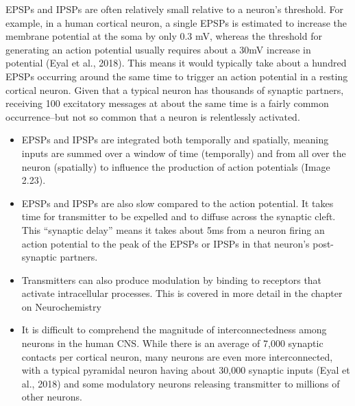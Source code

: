 \documentclass[
]{book}
\providecommand{\tightlist}{%
  \setlength{\itemsep}{0pt}\setlength{\parskip}{0pt}}
\begin{document}
EPSPs and IPSPs are often relatively small relative to a neuron's threshold. For example, in a human cortical neuron, a single EPSPs is estimated to increase the membrane potential at the soma by only 0.3 mV, whereas the threshold for generating an action potential usually requires about a 30mV increase in potential (Eyal et al., 2018). This means it would typically take about a hundred EPSPs occurring around the same time to trigger an action potential in a resting cortical neuron. Given that a typical neuron has thousands of synaptic partners, receiving 100 excitatory messages at about the same time is a fairly common occurrence--but not so common that a neuron is relentlessly activated.

\begin{itemize}
\tightlist
\item
  EPSPs and IPSPs are integrated both temporally and spatially, meaning inputs are summed over a window of time (temporally) and from all over the neuron (spatially) to influence the production of action potentials (Image 2.23).
\item
  EPSPs and IPSPs are also slow compared to the action potential. It takes time for transmitter to be expelled and to diffuse across the synaptic cleft. This ``synaptic delay'' means it takes about 5ms from a neuron firing an action potential to the peak of the EPSPs or IPSPs in that neuron's post-synaptic partners.
\item
  Transmitters can also produce modulation by binding to receptors that activate intracellular processes. This is covered in more detail in the chapter on Neurochemistry
\item
  It is difficult to comprehend the magnitude of interconnectedness among neurons in the human CNS. While there is an average of 7,000 synaptic contacts per cortical neuron, many neurons are even more interconnected, with a typical pyramidal neuron having about 30,000 synaptic inputs (Eyal et al., 2018) and some modulatory neurons releasing transmitter to millions of other neurons.
\end{itemize}
\end{document}

